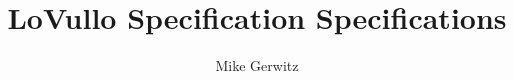 \documentclass[draft]{lvspec}
\begin{document}
  \title{LoVullo Specification Specifications}
  \author{Mike Gerwitz}
  \maketitle
\end{document}

